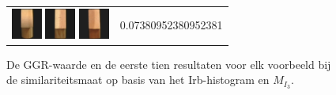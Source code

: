 \begin{figure}[!bp]
\begin{tabular}{m{11cm} | m{3cm} |}
\includegraphics[width=1cm]{coil/beeld-2.eps}
\includegraphics[width=1cm]{coil/beeld-47.eps}
\includegraphics[width=1cm]{coil/beeld-44.eps}
& {\scriptsize 0.07380952380952381}
\\
\end{tabular}
\vspace{5pt}
\caption{\label{fig:results_irb_histgeb}De GGR-waarde en de eerste tien resultaten voor elk 
voorbeeld bij de similariteitsmaat op basis van het Irb-histogram en $M_{I_3}$.}
\end{figure}
%
